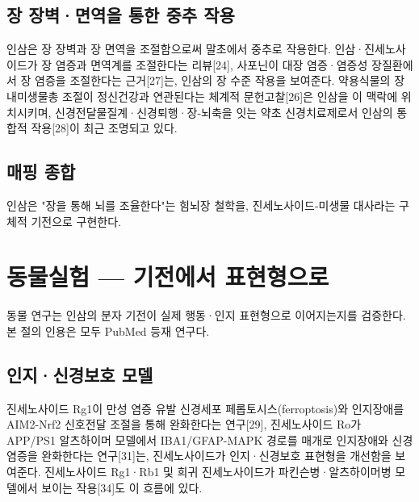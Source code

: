 \documentclass[11pt,oneside]{book}
\begin{document}
\subsection{장 장벽·면역을 통한 중추 작용}
인삼은 장 장벽과 장 면역을 조절함으로써 말초에서 중추로 작용한다. 인삼·진세노사이드가 장 염증과 면역계를 조절한다는 리뷰[24], 사포닌이 대장 염증·염증성 장질환에서 장 염증을 조절한다는 근거[27]는, 인삼의 장 수준 작용을 보여준다. 약용식물의 장내미생물총 조절이 정신건강과 연관된다는 체계적 문헌고찰[26]은 인삼을 이 맥락에 위치시키며, 신경전달물질계·신경퇴행·장-뇌축을 잇는 약초 신경치료제로서 인삼의 통합적 작용[28]이 최근 조명되고 있다.

\subsection{매핑 종합}
\vspace{2pt}\vspace{3pt}

인삼은 "장을 통해 뇌를 조율한다"는 힘뇌장 철학을, 진세노사이드-미생물 대사라는 구체적 기전으로 구현한다.

\section{동물실험 — 기전에서 표현형으로}
동물 연구는 인삼의 분자 기전이 실제 행동·인지 표현형으로 이어지는지를 검증한다. 본 절의 인용은 모두 PubMed 등재 연구다.

\subsection{인지·신경보호 모델}
진세노사이드 Rg1이 만성 염증 유발 신경세포 페롭토시스(ferroptosis)와 인지장애를 AIM2-Nrf2 신호전달 조절을 통해 완화한다는 연구[29], 진세노사이드 Ro가 APP/PS1 알츠하이머 모델에서 IBA1/GFAP-MAPK 경로를 매개로 인지장애와 신경염증을 완화한다는 연구[31]는, 진세노사이드가 인지·신경보호 표현형을 개선함을 보여준다. 진세노사이드 Rg1·Rb1 및 희귀 진세노사이드가 파킨슨병·알츠하이머병 모델에서 보이는 작용[34]도 이 흐름에 있다.
\end{document}

